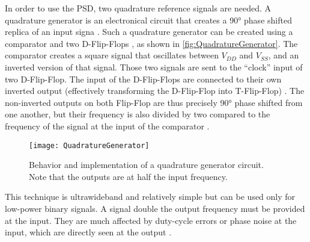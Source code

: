 In order to use the PSD, two quadrature reference signals are needed. A quadrature generator is an electronical circuit that creates a 90° phase shifted replica of an input signa \cite{Jorgesen2015}. Such a quadrature generator can be created using a comparator and two D-Flip-Flops \cite{horowitz1989art}, as shown in \autoref{fig:QuadratureGenerator}. The comparator creates a square signal that oscillates between $V_{DD}$ and $V_{SS}$, and an inverted version of that signal. Those two signals are sent to the “clock” input of two D-Flip-Flop. The input of the D-Flip-Flops are connected to their own inverted output (effectively transforming the D-Flip-Flop into T-Flip-Flop) \cite{horowitz1989art}. The non-inverted outputs on both Flip-Flop are thus precisely 90° phase shifted from one another, but their frequency is also divided by two compared to the frequency of the signal at the input of the comparator \cite{Jorgesen2015}. \par
\begin{figure}[h]
    \centering
    \texttt{[image: QuadratureGenerator]}
    \caption{Behavior and implementation of a quadrature generator circuit. Note that the outputs are at half the input frequency.}
    \label{fig:QuadratureGenerator}
\end{figure}
This technique is ultrawideband and relatively simple but can be used only for low-power binary signals. A signal double the output frequency must be provided at the input. They are much affected by duty-cycle errors or phase noise at the input, which are directly seen at the output \cite{Jorgesen2015}.  
